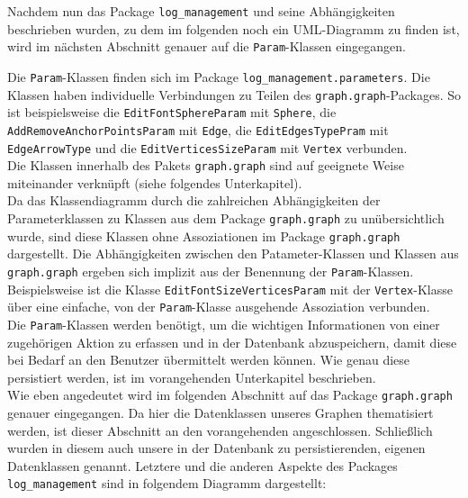 \documentclass[enabledeprecatedfontcommands,fontsize=11pt,paper=a4,twoside]{scrartcl}
\newcounter{one}
\begin{document}
Nachdem nun das Package \texttt{log\_management} und seine Abhängigkeiten beschrieben wurden, zu dem im folgenden noch ein UML-Diagramm zu finden ist, wird im nächsten Abschnitt genauer auf die \texttt{Param}-Klassen eingegangen.





Die \texttt{Param}-Klassen finden sich im Package \texttt{log\_management.parameters}. 
Die Klassen haben individuelle Verbindungen zu Teilen des \texttt{graph.graph}-Packages. So ist beispielsweise die \texttt{EditFontSphereParam} mit \texttt{Sphere}, die \texttt{AddRemoveAnchorPointsParam} mit \texttt{Edge}, die \texttt{EditEdgesTypePram} mit \texttt{EdgeArrowType} und die \texttt{EditVerticesSizeParam} mit \texttt{Vertex} verbunden. \\
Die Klassen innerhalb des Pakets \texttt{graph.graph} sind auf geeignete Weise miteinander verknüpft (siehe folgendes Unterkapitel). \\ 
Da das Klassendiagramm durch die zahlreichen Abhängigkeiten der Parameterklassen zu Klassen aus dem Package \texttt{graph.graph} zu unübersichtlich wurde, sind diese Klassen ohne Assoziationen im Package \texttt{graph.graph} dargestellt. Die Abhängigkeiten zwischen den Patameter-Klassen und Klassen aus \texttt{graph.graph} ergeben sich implizit aus der Benennung der \texttt{Param}-Klassen. Beispielsweise ist die Klasse \texttt{EditFontSizeVerticesParam} mit der \texttt{Vertex}-Klasse über eine einfache, von der \texttt{Param}-Klasse ausgehende Assoziation verbunden. \\

Die \texttt{Param}-Klassen werden benötigt, um die wichtigen Informationen von einer zugehörigen Aktion zu erfassen und in der Datenbank abzuspeichern, damit diese bei Bedarf an den Benutzer übermittelt werden können. Wie genau diese persistiert werden, ist im vorangehenden Unterkapitel beschrieben.\\

Wie eben angedeutet wird im folgenden Abschnitt auf das Package \texttt{graph.graph} genauer eingegangen. Da hier die Datenklassen unseres Graphen thematisiert werden, ist dieser Abschnitt an den vorangehenden angeschlossen. Schließlich wurden in diesem auch unsere in der Datenbank zu persistierenden, eigenen Datenklassen genannt. Letztere und die anderen Aspekte des Packages \texttt{log\_management} sind in folgendem Diagramm dargestellt:
\end{document}
